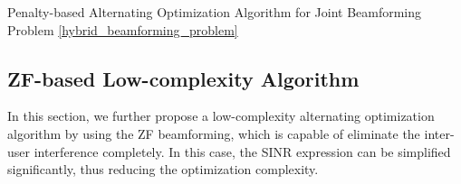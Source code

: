 \begin{algorithm}[tb]
    \caption{Penalty-based Alternating Optimization Algorithm for Joint Beamforming Problem \eqref{hybrid_beamforming_problem}}
    \label{alg:PDD}
    \begin{algorithmic}[1]
        \REPEAT
            \REPEAT
    \end{algorithmic}
\end{algorithm}

\subsection{ZF-based Low-complexity Algorithm}

In this section, we further propose a low-complexity alternating optimization algorithm by using the ZF beamforming, which is capable of eliminate the inter-user interference completely. In this case, the SINR expression can be simplified significantly, thus reducing the optimization complexity. 

